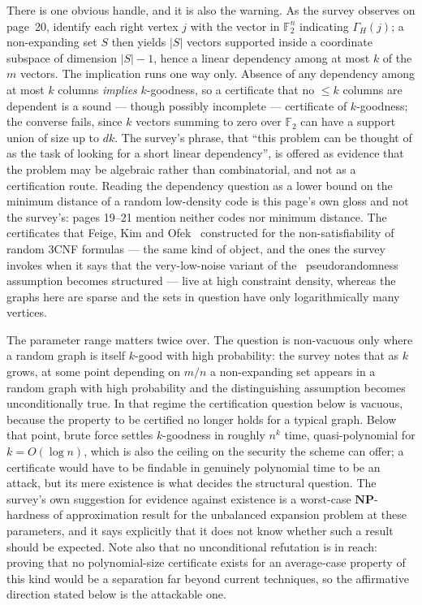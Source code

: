 \documentclass{conjura-conjecture}
\newcommand{\NP}{\mathbf{NP}}
\newcommand{\Nbr}{\Gamma_H}
\newcommand{\FF}{\mathbb{F}_2}
\begin{document}
There is one obvious handle, and it is also the warning. As the survey
observes on page~20, identify each right vertex $j$ with the vector in
$\FF^n$ indicating $\Nbr(j)$; a non-expanding set $S$ then yields $|S|$
vectors supported inside a coordinate subspace of dimension $|S|-1$,
hence a linear dependency among at most $k$ of the $m$ vectors. The
implication runs one way only. Absence of any dependency among at most
$k$ columns \emph{implies} $k$-goodness, so a certificate that no
$\le k$ columns are dependent is a sound --- though possibly
incomplete --- certificate of $k$-goodness; the converse fails, since
$k$ vectors summing to zero over $\FF$ can have a support union of size
up to $dk$. The survey's phrase, that ``this problem can be thought of
as the task of looking for a short linear dependency'', is offered as
evidence that the problem may be algebraic rather than combinatorial,
and not as a certification route. Reading the dependency question as a
lower bound on the minimum distance of a random low-density code is
this page's own gloss and not the survey's: pages 19--21 mention
neither codes nor minimum distance. The certificates that Feige, Kim
and Ofek~\cite{FKO06} constructed for the non-satisfiability of random
3CNF formulas --- the same kind of object, and the ones the survey
invokes when it says that the very-low-noise variant of
the~\cite{ABW10} pseudorandomness assumption becomes structured ---
live at high constraint density, whereas the graphs here are sparse and
the sets in question have only logarithmically many vertices.

The parameter range matters twice over. The question is non-vacuous
only where a random graph is itself $k$-good with high probability: the
survey notes that as $k$ grows, at some point depending on $m/n$ a
non-expanding set appears in a random graph with high probability and
the distinguishing assumption becomes unconditionally true. In that
regime the certification question below is vacuous, because the
property to be certified no longer holds for a typical graph. Below
that point, brute force settles $k$-goodness in roughly $n^{k}$ time,
quasi-polynomial for $k = O(\log n)$, which is also the ceiling on the
security the scheme can offer; a certificate would have to be findable
in genuinely polynomial time to be an attack, but its mere existence is
what decides the structural question. The survey's own suggestion for
evidence against existence is a worst-case $\NP$-hardness of
approximation result for the unbalanced expansion problem at these
parameters, and it says explicitly that it does not know whether such a
result should be expected. Note also that no unconditional refutation
is in reach: proving that no polynomial-size certificate exists for an
average-case property of this kind would be a separation far beyond
current techniques, so the affirmative direction stated below is the
attackable one.
\end{document}
